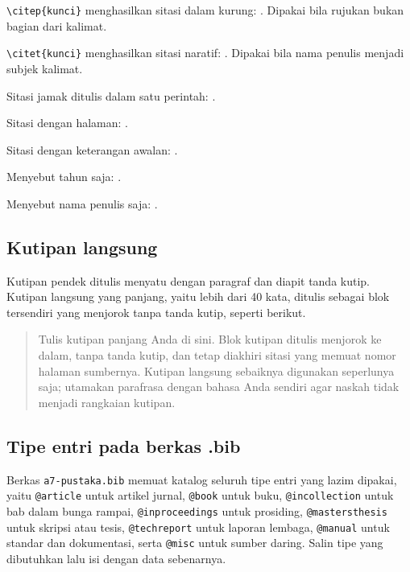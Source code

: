 \begin{daftarpoin}
    \item \texttt{\textbackslash citep\{kunci\}} menghasilkan sitasi dalam
          kurung: \citep{wijaya2022}. Dipakai bila rujukan bukan bagian dari
          kalimat.
    \item \texttt{\textbackslash citet\{kunci\}} menghasilkan sitasi naratif:
          \citet{wijaya2022}. Dipakai bila nama penulis menjadi subjek kalimat.
    \item Sitasi jamak ditulis dalam satu perintah:
          \citep{wijaya2022, pratama2023, sari2024}.
    \item Sitasi dengan halaman:
          \citep[hlm.~118]{barnes2002}.
    \item Sitasi dengan keterangan awalan:
          \citep[lihat][]{martilla1977}.
    \item Menyebut tahun saja: \citeyearpar{martilla1977}.
    \item Menyebut nama penulis saja: \citeauthor{barnes2002}.
\end{daftarpoin}

\subsection{Kutipan langsung}
Kutipan pendek ditulis menyatu dengan paragraf dan diapit tanda kutip.
Kutipan langsung yang panjang, yaitu lebih dari 40 kata, ditulis sebagai blok
tersendiri yang menjorok tanpa tanda kutip, seperti berikut.

\begin{quote}
    \noindent Tulis kutipan panjang Anda di sini. Blok kutipan ditulis menjorok
    ke dalam, tanpa tanda kutip, dan tetap diakhiri sitasi yang memuat nomor
    halaman sumbernya. Kutipan langsung sebaiknya digunakan seperlunya saja;
    utamakan parafrasa dengan bahasa Anda sendiri agar naskah tidak menjadi
    rangkaian kutipan. \citep[hlm.~120]{barnes2002}
\end{quote}

\subsection{Tipe entri pada berkas .bib}
Berkas \texttt{a7-pustaka.bib} memuat katalog seluruh tipe entri yang lazim
dipakai, yaitu \texttt{@article} untuk artikel jurnal, \texttt{@book} untuk
buku, \texttt{@incollection} untuk bab dalam bunga rampai,
\texttt{@inproceedings} untuk prosiding, \texttt{@mastersthesis} untuk skripsi
atau tesis, \texttt{@techreport} untuk laporan lembaga, \texttt{@manual} untuk
standar dan dokumentasi, serta \texttt{@misc} untuk sumber daring. Salin tipe
yang dibutuhkan lalu isi dengan data sebenarnya.

